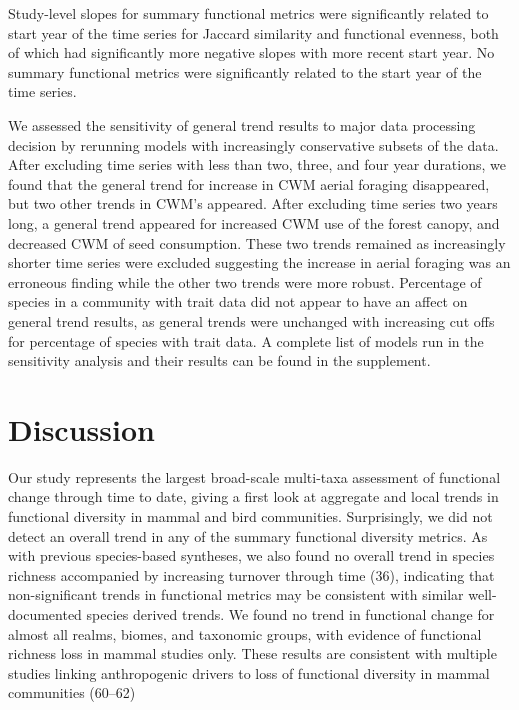 \documentclass{article}
\begin{document}
Study-level slopes for summary functional metrics were significantly
related to start year of the time series for Jaccard similarity and
functional evenness, both of which had significantly more negative
slopes with more recent start year. No summary functional metrics were
significantly related to the start year of the time series.

We assessed the sensitivity of general trend results to major data
processing decision by rerunning models with increasingly conservative
subsets of the data. After excluding time series with less than two,
three, and four year durations, we found that the general trend for
increase in CWM aerial foraging disappeared, but two other trends in
CWM's appeared. After excluding time series two years long, a general
trend appeared for increased CWM use of the forest canopy, and decreased
CWM of seed consumption. These two trends remained as increasingly
shorter time series were excluded suggesting the increase in aerial
foraging was an erroneous finding while the other two trends were more
robust. Percentage of species in a community with trait data did not
appear to have an affect on general trend results, as general trends
were unchanged with increasing cut offs for percentage of species with
trait data. A complete list of models run in the sensitivity analysis
and their results can be found in the supplement.

\hypertarget{discussion}{%
\section{Discussion}\label{discussion}}

Our study represents the largest broad-scale multi-taxa assessment of
functional change through time to date, giving a first look at aggregate
and local trends in functional diversity in mammal and bird communities.
Surprisingly, we did not detect an overall trend in any of the summary
functional diversity metrics. As with previous species-based syntheses,
we also found no overall trend in species richness accompanied by
increasing turnover through time (36), indicating that non-significant
trends in functional metrics may be consistent with similar
well-documented species derived trends. We found no trend in functional
change for almost all realms, biomes, and taxonomic groups, with
evidence of functional richness loss in mammal studies only. These
results are consistent with multiple studies linking anthropogenic
drivers to loss of functional diversity in mammal communities (60--62)
\end{document}
